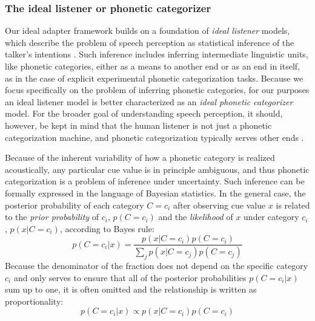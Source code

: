 \subsubsection{The ideal listener or phonetic categorizer}
\label{sec:ideal-phon-categ}

Our ideal adapter framework builds on a foundation of {\em ideal listener} models, which describe the problem of speech perception as statistical inference of the talker's intentions \autocite{Clayards2008,Feldman2009a,Norris2008,Sonderegger2010}. Such inference includes inferring intermediate linguistic units, like phonetic categories, either as a means to another end or as an end in itself, as in the case of explicit experimental phonetic categorization tasks.  Because we focus specifically on the problem of inferring phonetic categories, for our purposes an ideal listener model is better characterized as an {\em ideal phonetic categorizer} model. For the broader goal of understanding speech perception, it should, however, be kept in mind that the human listener is not just a phonetic categorization machine, and phonetic categorization typically serves other ends \autocites[such as lexical access,][]{Norris2008}[or even the successful inference of communicative intentions][]{Jaeger2013b}.

Because of the inherent variability of how a phonetic category is realized acoustically, any particular cue value is in principle ambiguous, and thus phonetic categorization is a problem of inference under uncertainty.  Such inference can be formally expressed in the language of Bayesian statistics.  In the general case, the posterior probability of each category $C=c_i$ after observing cue value $x$ is related to the \emph{prior probability} of $c_i$,  $p(C=c_i)$ and the \emph{likelihood} of $x$ under category $c_i$, $p(x|C=c_i)$, according to Bayes rule:
\begin{equation*}
  p(C=c_i | x) = \frac{p(x | C=c_i) p(C=c_i)}{\sum_j p(x|C=c_j) p(C=c_j)}  %
\end{equation*}
Because the denominator of the fraction does not depend on the specific category $c_i$ and only serves to ensure that all of the posterior probabilities $p(C=c_i | x)$ sum up to one, it is often omitted and the relationship is written as proportionality:
\begin{equation*}
  p(C=c_i | x) \propto p(x | C=c_i) p(C=c_i)
\end{equation*}

